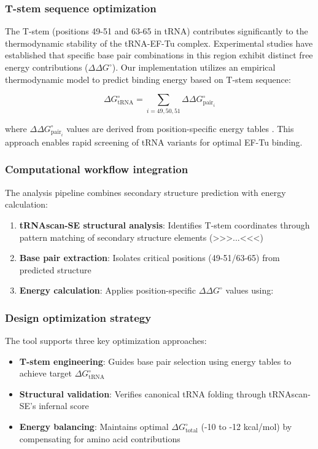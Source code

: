 \subsubsection{T-stem sequence optimization}
The T-stem (positions 49-51 and 63-65 in tRNA) contributes significantly to the thermodynamic stability of the tRNA-EF-Tu complex. Experimental studies have established that specific base pair combinations in this region exhibit distinct free energy contributions ($\Delta\Delta G^{\circ}$). Our implementation utilizes an empirical thermodynamic model to predict binding energy based on T-stem sequence:

\[
\Delta G^{\circ}_{\text{tRNA}} = \sum_{i=49,50,51} \Delta\Delta G^{\circ}_{\text{pair}_i}
\]

where $\Delta\Delta G^{\circ}_{\text{pair}_i}$ values are derived from position-specific energy tables . This approach enables rapid screening of tRNA variants for optimal EF-Tu binding.

\subsubsection{Computational workflow integration}
The analysis pipeline combines secondary structure prediction with energy calculation:

\begin{enumerate}
    \item \textbf{tRNAscan-SE structural analysis}: Identifies T-stem coordinates through pattern matching of secondary structure elements (>>>...<<<)
    \item \textbf{Base pair extraction}: Isolates critical positions (49-51/63-65) from predicted structure
    \item \textbf{Energy calculation}: Applies position-specific $\Delta\Delta G^{\circ}$ values using:
\end{enumerate}



\subsubsection{Design optimization strategy}
The tool supports three key optimization approaches:

\begin{itemize}
    \item \textbf{T-stem engineering}: Guides base pair selection using energy tables to achieve target $\Delta G^{\circ}_{\text{tRNA}}$
    \item \textbf{Structural validation}: Verifies canonical tRNA folding through tRNAscan-SE's infernal score
    \item \textbf{Energy balancing}: Maintains optimal $\Delta G^{\circ}_{\text{total}}$ (-10 to -12 kcal/mol) by compensating for amino acid contributions
\end{itemize}



